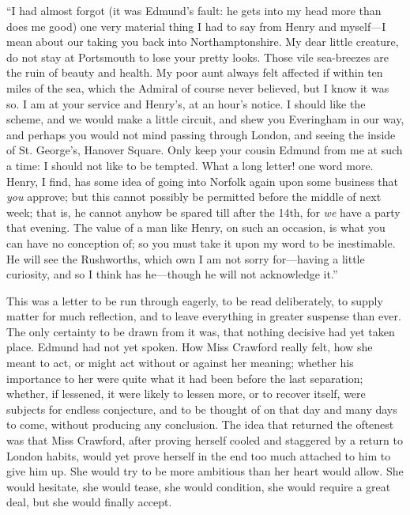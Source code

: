 \documentclass{article}
\begin{document}
``I had almost forgot (it was Edmund's fault:  he gets into
my head more than does me good) one very material thing I
had to say from Henry and myself---I mean about our taking
you back into Northamptonshire.  My dear little creature,
do not stay at Portsmouth to lose your pretty looks.
Those vile sea-breezes are the ruin of beauty and health.
My poor aunt always felt affected if within ten miles
of the sea, which the Admiral of course never believed,
but I know it was so.  I am at your service and Henry's,
at an hour's notice.  I should like the scheme, and we would
make a little circuit, and shew you Everingham in our way,
and perhaps you would not mind passing through London,
and seeing the inside of St. George's, Hanover Square.
Only keep your cousin Edmund from me at such a time:
I should not like to be tempted.  What a long letter!
one word more.  Henry, I find, has some idea of going
into Norfolk again upon some business that \emph{you} approve;
but this cannot possibly be permitted before the middle
of next week; that is, he cannot anyhow be spared till
after the 14th, for \emph{we} have a party that evening.
The value of a man like Henry, on such an occasion,
is what you can have no conception of; so you must take it
upon my word to be inestimable.  He will see the Rushworths,
which own I am not sorry for---having a little curiosity,
and so I think has he---though he will not acknowledge
it.''

This was a letter to be run through eagerly, to be
read deliberately, to supply matter for much reflection,
and to leave everything in greater suspense than ever.
The only certainty to be drawn from it was, that nothing
decisive had yet taken place.  Edmund had not yet spoken.
How Miss Crawford really felt, how she meant to act,
or might act without or against her meaning; whether his
importance to her were quite what it had been before
the last separation; whether, if lessened, it were likely
to lessen more, or to recover itself, were subjects
for endless conjecture, and to be thought of on that day
and many days to come, without producing any conclusion.
The idea that returned the oftenest was that Miss Crawford,
after proving herself cooled and staggered by a return
to London habits, would yet prove herself in the end
too much attached to him to give him up.  She would
try to be more ambitious than her heart would allow.
She would hesitate, she would tease, she would condition,
she would require a great deal, but she would finally
accept.
\end{document}
